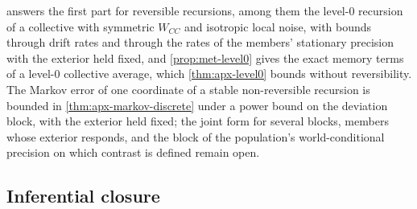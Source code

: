  answers the first part for reversible recursions, among them the level-0 recursion of a collective with symmetric $W_{CC}$ and isotropic local noise, with bounds through drift rates and through the rates of the members' stationary precision with the exterior held fixed, and \cref{prop:met-level0} gives the exact memory terms of a level-0 collective average, which \cref{thm:apx-level0} bounds without reversibility. The Markov error of one coordinate of a stable non-reversible recursion is bounded in \cref{thm:apx-markov-discrete} under a power bound on the deviation block, with the exterior held fixed; the joint form for several blocks, members whose exterior responds, and the block of the population's world-conditional precision on which contrast is defined remain open.

\subsection{Inferential closure}\label{sup:agy-inferential-closure}

